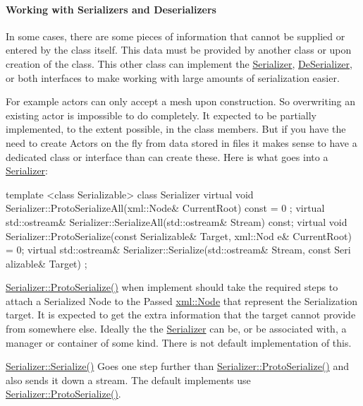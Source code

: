  \par
 \hypertarget{Serialization_serializationserializers}{}\paragraph{Working with Serializers and Deserializers}\label{Serialization_serializationserializers}
In some cases, there are some pieces of information that cannot be supplied or entered by the class itself. This data must be provided by another class or upon creation of the class. This other class can implement the \hyperlink{classphys_1_1Serializer}{Serializer}, \hyperlink{classphys_1_1DeSerializer}{DeSerializer}, or both interfaces to make working with large amounts of serialization easier. \par
 \par
 For example actors can only accept a mesh upon construction. So overwriting an existing actor is impossible to do completely. It expected to be partially implemented, to the extent possible, in the class members. But if you have the need to create Actors on the fly from data stored in files it makes sense to have a dedicated class or interface than can create these. Here is what goes into a \hyperlink{classphys_1_1Serializer}{Serializer}: 
\begin{DoxyCode}
 template <class Serializable> class Serializer
 {
     virtual void Serializer::ProtoSerializeAll(xml::Node& CurrentRoot) const = 0
      ;
     virtual std::ostream& Serializer::SerializeAll(std::ostream& Stream) const;
     virtual void Serializer::ProtoSerialize(const Serializable& Target, xml::Nod
      e& CurrentRoot) = 0;
     virtual std::ostream& Serializer::Serialize(std::ostream& Stream, const Seri
      alizable& Target)
 };
\end{DoxyCode}
 \hyperlink{classphys_1_1Serializer_a337a685f966e6d06bfb382905b29db5a}{Serializer::ProtoSerialize()} when implement should take the required steps to attach a Serialized Node to the Passed \hyperlink{classphys_1_1xml_1_1Node}{xml::Node} that represent the Serialization target. It is expected to get the extra information that the target cannot provide from somewhere else. Ideally the the \hyperlink{classphys_1_1Serializer}{Serializer} can be, or be associated with, a manager or container of some kind. There is not default implementation of this. \par
 \par
 \hyperlink{classphys_1_1Serializer_a013ef8c6c9be4d9d3e85488e039b9772}{Serializer::Serialize()} Goes one step further than \hyperlink{classphys_1_1Serializer_a337a685f966e6d06bfb382905b29db5a}{Serializer::ProtoSerialize()} and also sends it down a stream. The default implements use \hyperlink{classphys_1_1Serializer_a337a685f966e6d06bfb382905b29db5a}{Serializer::ProtoSerialize()}. \par
